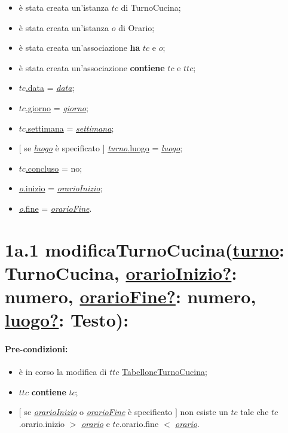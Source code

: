 \begin{itemize}
    \item è stata creata un'istanza $tc$ di TurnoCucina;
    \item è stata creata un'istanza $o$ di Orario;
    \item è stata creata un'associazione \textbf{ha} $tc$ e $o$;
    \item è stata creata un'associazione \textbf{contiene} $tc$ e $ttc$;
    \item \underline{$tc$.data} = \underline{\textit{data}};
    \item \underline{$tc$.giorno} = \underline{\textit{giorno}};
    \item \underline{$tc$.settimana} = \underline{\textit{settimana}};
    \item $[$ se \underline{\textit{luogo}} è specificato $]$ \underline{\textit{turno}.luogo} = \underline{\textit{luogo}};
    \item \underline{$tc$.concluso}  = no;
    \item \underline{\textit{o}.inizio}  = \underline{\textit{orarioInizio}};
    \item \underline{\textit{o}.fine}  = \underline{\textit{orarioFine}}.
    
\end{itemize}

\section*{1a.1 modificaTurnoCucina(\underline{turno}: TurnoCucina, \underline{orarioInizio?}: numero, \underline{orarioFine?}: numero, \underline{luogo?}: Testo):}

\paragraph{Pre-condizioni:}

\begin{itemize}
 \item è in corso la modifica di $ttc$ \underline{TabelloneTurnoCucina};
 \item $ttc$ \textbf{contiene} $tc$;
 \item $[$ se \underline{\textit{orarioInizio}} o \underline{\textit{orarioFine}} è specificato $]$ non esiste un $tc$ tale che $tc$.orario.inizio $>$ \underline{\textit{orario}} e $tc$.orario.fine $<$ \underline{\textit{orario}}.
\end{itemize}

